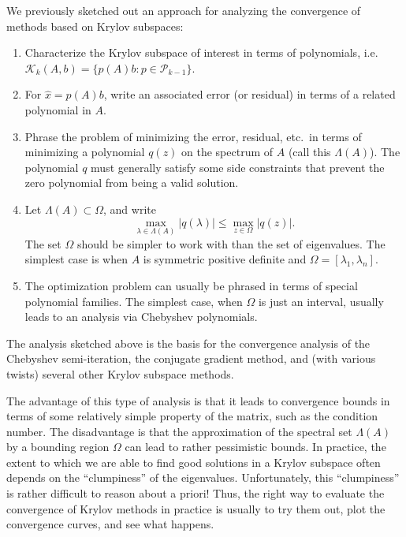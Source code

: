 \documentclass[12pt, leqno]{article} %
\begin{document}
We previously sketched out an approach for analyzing the convergence of
methods based on Krylov subspaces:
\begin{enumerate}
\item
  Characterize the Krylov subspace of interest in terms of polynomials,
  i.e. $\mathcal{K}_k(A,b) = \{ p(A)b : p \in \mathcal{P}_{k-1} \}$.
\item
  For $\hat{x} = p(A) b$, write an associated error (or residual)
  in terms of a related polynomial in $A$.
\item
  Phrase the problem of minimizing the error, residual, etc.~in terms
  of minimizing a polynomial $q(z)$ on the spectrum of $A$
  (call this $\Lambda(A)$).  The polynomial $q$ must generally satisfy
  some side constraints that prevent the zero polynomial from being
  a valid solution.
\item
  Let $\Lambda(A) \subset \Omega$, and write
  \[
    \max_{\lambda \in \Lambda(A)} |q(\lambda)| \leq
    \max_{z \in \Omega} |q(z)|.
  \]
  The set $\Omega$ should be simpler to work with than the set of
  eigenvalues.  The simplest case is when $A$ is symmetric positive
  definite and $\Omega = [\lambda_1, \lambda_n]$.
\item
  The optimization problem can usually be phrased in terms of special
  polynomial families.  The simplest case, when $\Omega$ is just an
  interval, usually leads to an analysis via Chebyshev polynomials.
\end{enumerate}
The analysis sketched above is the basis for the convergence analysis
of the Chebyshev semi-iteration, the conjugate gradient method, and
(with various twists) several other Krylov subspace methods.

The advantage of this type of analysis is that it leads to convergence
bounds in terms of some relatively simple property of the matrix, such
as the condition number.  The disadvantage is that the approximation of
the spectral set $\Lambda(A)$ by a bounding region $\Omega$ can lead to
rather pessimistic bounds.  In practice, the extent to which we are able
to find good solutions in a Krylov subspace often depends on the
``clumpiness'' of the eigenvalues.  Unfortunately, this ``clumpiness''
is rather difficult to reason about a priori!  Thus, the right way to evaluate
the convergence of Krylov methods in practice is usually to try them out,
plot the convergence curves, and see what happens.
\end{document}
